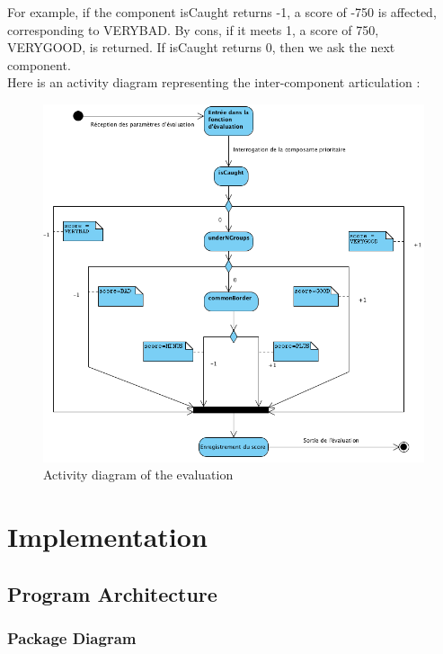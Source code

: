 \documentclass[11pt,a4paper]{report}
\begin{document}
For example, if the component isCaught returns -1, a score of -750 is affected, corresponding to VERYBAD. By cons, if it meets 1, a score of 750, VERYGOOD, is returned. If isCaught returns 0, then we ask the next component.\\



Here is an activity diagram representing the inter-component articulation :

\begin{figure}[h]
\centering
\includegraphics[width=1\textwidth]{images/activity_diagram.png}
\caption{Activity diagram of the evaluation}
\label{activity_diagram}
\end{figure}

\chapter*{Implementation}

\section*{Program Architecture}

\subsection*{Package Diagram}
\end{document}

